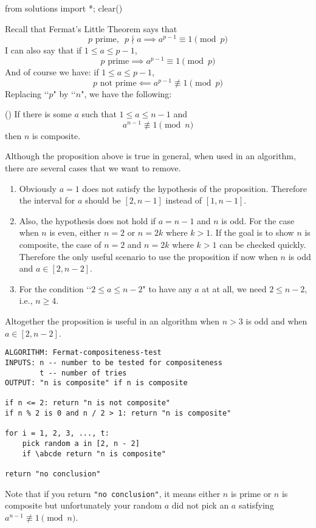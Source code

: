 \begin{python0}
from solutions import *; clear()
\end{python0}

\newcommand\abcde{$\texttt{a}^\texttt{n - 1} \not\equiv \texttt{1} \ \texttt{(mod n)}$}

Recall that Fermat's Little Theorem says
that 
\[
  \text{$p$ prime}, \,\,\,
  p \nmid a \implies a^{p-1} \equiv 1 \pmod{p}
\]
I can also say that if $1 \leq a \leq p - 1$,
\[
\text{$p$ prime}
\implies
a^{p-1} \equiv 1 \pmod{p}
\]
And of course we have:
if
$1 \leq a \leq p - 1$,
\[
\text{$p$ not prime}
\impliedby
a^{p-1} \not\equiv 1 \pmod{p}
\]
Replacing \lq\lq $p$" by \lq\lq $n$",
we have the following:

\begin{prop} \textnormal{()}
If there is some $a$ such that $1 \leq a \leq n - 1$ and 
\[
a^{n-1} \not\equiv 1 \pmod{n}
\]
then $n$ is composite.
\end{prop}

Although the proposition above is true in general,
when used in an algorithm, there are several cases that we want to remove.
\begin{enumerate}[nosep]
\item
  Obviously $a = 1$ does not satisfy the hypothesis of the proposition.
  Therefore the interval for $a$ should be $[2, n-1]$ instead of $[1, n-1]$.
\item
  Also, the hypothesis does not hold if $a = n-1$ and $n$ is odd.
  For the case when $n$ is even, either $n = 2$ or $n = 2k$ where $k > 1$.
  If the goal is to show $n$ is composite, the case of $n = 2$ and
  $n = 2k$ where $k > 1$ can be checked quickly.
  Therefore the only useful scenario to use the proposition if now
  when $n$ is odd and $a \in [2, n-2]$.
\item
  For the condition \lq\lq $2 \leq a \leq n - 2$" to have any $a$ at
  at all, we need $2 \leq n - 2$, i.e., $n \geq 4$.
\end{enumerate}
Altogether the proposition is useful in an algorithm
when $n > 3$ is odd and when $a \in [2, n - 2]$.

\begin{Verbatim}[frame=single,fontsize=\footnotesize,commandchars=\\\{\}]
ALGORITHM: Fermat-compositeness-test
INPUTS: n -- number to be tested for compositeness
        t -- number of tries
OUTPUT: "n is composite" if n is composite

if n <= 2: return "n is not composite"
if n % 2 is 0 and n / 2 > 1: return "n is composite"

for i = 1, 2, 3, ..., t:
    pick random a in [2, n - 2]
    if \abcde return "n is composite"

return "no conclusion"
\end{Verbatim}
Note that if you return \verb!"no conclusion"!, it means either $n$
is prime or $n$ is composite but unfortunately your random
$a$ did not pick an $a$ satisfying
$a^{n-1} \not\equiv 1 \pmod{n}$.

